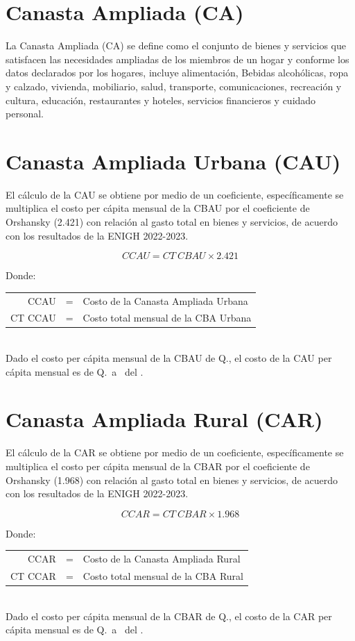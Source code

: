 \documentclass[letterpaper, 12pt, twoside]{article}
\begin{document}
\section*{Canasta Ampliada (CA)}

La Canasta Ampliada (CA) se define como el conjunto de bienes y servicios que
satisfacen las necesidades ampliadas de los miembros de un hogar y conforme los
datos declarados por los hogares, incluye alimentación, Bebidas alcohólicas,
ropa y calzado, vivienda, mobiliario, salud, transporte, comunicaciones,
recreación y cultura, educación, restaurantes y hoteles, servicios financieros y
cuidado personal. 

\section*{Canasta Ampliada Urbana (CAU)}

El cálculo de la CAU se obtiene por medio de un coeficiente, específicamente se
multiplica el costo per cápita mensual de la CBAU por el coeficiente de
Orshansky (2.421) con relación al gasto total en bienes y servicios, de acuerdo
con los resultados de la ENIGH 2022-2023.

{\color{AzulAcento} \[CCAU = CT\ CBAU \times 2.421\]}

Donde:

\begin{tabular}{r c l}
  CCAU & = & Costo de la Canasta Ampliada Urbana \\
  CT CCAU & = & Costo total mensual de la CBA Urbana
\end{tabular}
\\[\baselineskip]
Dado el costo per cápita mensual de la CBAU de Q.\CBAU, el costo de la CAU per
cápita mensual es de Q.\CAU\ a \mes\ del \anio.

\section*{Canasta Ampliada Rural (CAR)}

El cálculo de la CAR se obtiene por medio de un coeficiente, específicamente se
multiplica el costo per cápita mensual de la CBAR por el coeficiente de
Orshansky (1.968) con relación al gasto total en bienes y servicios, de acuerdo
con los resultados de la ENIGH 2022-2023.

{\color{AzulAcento} \[CCAR = CT\ CBAR \times 1.968\]}

Donde:

\begin{tabular}{r c l}
  CCAR & = & Costo de la Canasta Ampliada Rural \\
  CT CCAR & = & Costo total mensual de la CBA Rural
\end{tabular}
\\[\baselineskip]
Dado el costo per cápita mensual de la CBAR de Q.\CBAR, el costo de la CAR per
cápita mensual es de Q.\CAR\ a \mes\ del \anio.


\end{document}
